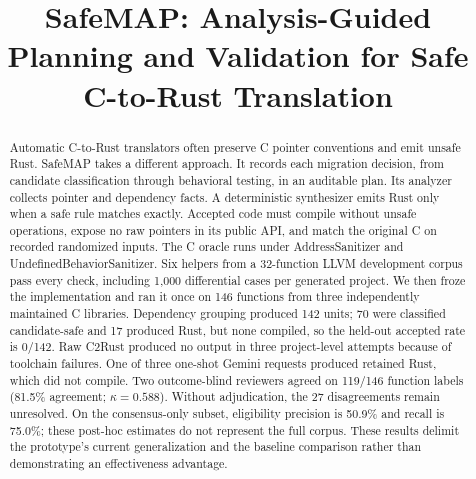 \documentclass[conference]{IEEEtran}
\newcommand{\tool}{SafeMAP\xspace}
\newif\ifanonymous
\begin{document}
\title{SafeMAP: Analysis-Guided Planning and Validation for Safe C-to-Rust Translation}

\ifanonymous
\author{\IEEEauthorblockN{Anonymous Submission}}
\else
\author{
\and
{}
\and
{}
}
\fi

\maketitle

\begin{abstract}
Automatic C-to-Rust translators often preserve C pointer conventions and emit
unsafe Rust. \tool takes a different approach. It records each migration
decision, from candidate classification through behavioral testing, in an
auditable plan. Its analyzer collects pointer and dependency facts. A
deterministic synthesizer emits Rust only when a safe rule matches exactly.
Accepted code must compile without unsafe operations, expose no raw pointers in
its public API, and match the original C on recorded randomized inputs. The C
oracle runs under AddressSanitizer and UndefinedBehaviorSanitizer. Six helpers
from a 32-function LLVM development corpus pass every check, including 1,000
differential cases per generated project. We then froze the implementation and
ran it once on 146 functions from three independently maintained C libraries.
Dependency grouping produced 142 units; 70 were classified candidate-safe and
17 produced Rust, but none compiled, so the held-out accepted rate is 0/142.
Raw C2Rust produced no output in three project-level attempts because of
toolchain failures. One of three one-shot Gemini requests produced retained
Rust, which did not compile. Two outcome-blind reviewers agreed on 119/146
function labels (81.5\% agreement; $\kappa=0.588$). Without adjudication, the
27 disagreements remain unresolved. On the consensus-only subset, eligibility
precision is 50.9\% and recall is 75.0\%; these post-hoc estimates do not
represent the full corpus.
These results delimit the prototype's current generalization and the baseline
comparison rather than demonstrating an effectiveness advantage.
\end{abstract}
\end{document}
